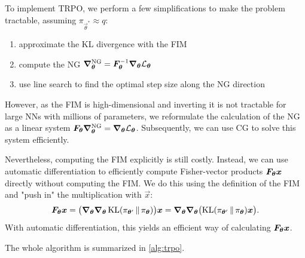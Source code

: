 			To implement \ac{TRPO}, we perform a few simplifications to make the problem tractable, assuming \( \pi_{\vec{\theta}^\ast} \approx q \):
			\begin{enumerate}
				\item approximate the \ac{KL} divergence with the \ac{FIM}
				\item compute the \ac{NG} \( \grad_{\bm{\theta}}^\mathrm{NG} = \bm{F}_{\bm{\theta}}^{-1} \grad_{\bm{\theta}} \mathcal{L}_{\bm{\theta}} \)
				\item use line search to find the optimal step size along the \ac{NG} direction
			\end{enumerate}
			However, as the \ac{FIM} is high-dimensional and inverting it is not tractable for large \acp{NN} with millions of parameters, we reformulate the calculation of the \ac{NG} as a linear system \( \bm{F}_{\bm{\theta}} \grad_{\bm{\theta}}^\mathrm{NG} = \grad_{\bm{\theta}} \mathcal{L}_{\bm{\theta}} \). Subsequently, we can use \ac{CG} to solve this system efficiently.

			Nevertheless, computing the \ac{FIM} explicitly is still costly. Instead, we can use automatic differentiation to efficiently compute Fisher-vector products \( \bm{F}_{\bm{\theta}} \bm{x} \) directly without computing the \ac{FIM}. We do this using the definition of the \ac{FIM} and "push in" the multiplication with \(\vec{x}\):
			\begin{equation}
				\bm{F}_{\bm{\theta}} \bm{x}
					= \bigl( \grad_{\bm{\theta}} \grad_{\bm{\theta}} \operatorname{KL}(\pi_{\bm{\theta}'} \,\Vert\, \pi_{\bm{\theta}}) \bigr) \bm{x}
					= \grad_{\bm{\theta}} \grad_{\bm{\theta}} \bigl( \operatorname{KL}(\pi_{\bm{\theta}'} \,\Vert\, \pi_{\bm{\theta}}) \bm{x} \bigr).
			\end{equation}
			With automatic differentiation, this yields an efficient way of calculating \( \bm{F}_{\bm{\theta}} \bm{x} \).

			The whole algorithm is summarized in \autoref{alg:trpo}.

